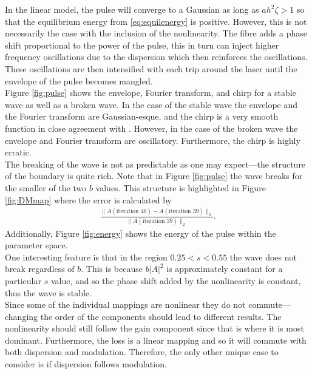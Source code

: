 \documentclass[%
 aps,
 jmp,%
 amsmath,amssymb,
 reprint,%
nofootinbib
]{revtex4-1}
\begin{document}
In the linear model, the pulse will converge to a Gaussian as long as $a h^2 \zeta > 1$ so that the equilibrium energy from \eqref{eq:equilenergy} is positive. However, this is not necessarily the case with the inclusion of the nonlinearity. The fibre adds a phase shift proportional to the power of the pulse, this in turn can inject higher frequency oscillations due to the dispersion which then reinforces the oscillations. These oscillations are then intensified with each trip around the laser until the envelope of the pulse becomes mangled. \\

Figure \ref{fig:pulse} shows the envelope, Fourier transform, and chirp for a stable wave as well as a broken wave. In the case of the stable wave the envelope and the Fourier transform are Gaussian-esque, and the chirp is a very smooth function in close agreement with \cite{chen}. However, in the case of the broken wave the envelope and Fourier transform are oscillatory. Furthermore, the chirp is highly erratic. \\

The breaking of the wave is not as predictable as one may expect---the structure of the boundary is quite rich. Note that in Figure \ref{fig:pulse} the wave breaks for the smaller of the two $b$ values. This structure is highlighted in Figure \ref{fig:DMmap} where the error is calculated by
\begin{align*}
\frac{\|A(\text{iteration } 40) - A(\text{iteration } 39) \|_2}{\|A(\text{iteration } 39) \|_2}.
\end{align*}
Additionally, Figure \ref{fig:energy} shows the energy of the pulse within the parameter space. \\

One interesting feature is that in the region $0.25 < s < 0.55$ the wave does not break regardless of $b$. This is because $b|A|^2$ is approximately constant for a particular $s$ value, and so the phase shift added by the nonlinearity is constant, thus the wave is stable. \\

Since some of the individual mappings are nonlinear they do not commute---changing the order of the components should lead to different results. The nonlinearity should still follow the gain component since that is where it is most dominant. Furthermore, the loss is a linear mapping and so it will commute with both dispersion and modulation. Therefore, the only other unique case to consider is if dispersion follows modulation. \\
\end{document}
